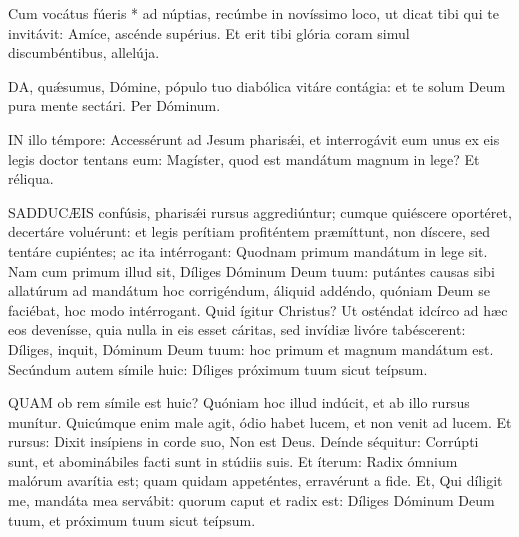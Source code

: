  Cum vocátus fúeris * ad núptias, recúmbe in novíssimo loco, ut dicat tibi qui te invitávit: Amíce, ascénde supérius. Et erit tibi glória coram simul discumbéntibus, allelúja.




\lettrine[lines=2]{D}{A}, quǽsumus, Dómine, pópulo tuo diabólica vitáre contágia: et te solum Deum pura mente sectári. Per Dóminum.




\lettrine[lines=2]{I}{N} illo témpore: Accessérunt ad Jesum pharisǽi, et interrogávit eum unus ex eis legis doctor tentans eum: Magíster, quod est mandátum magnum in lege? Et réliqua.



\lettrine[lines=2]{S}{ADDUCÆIS} confúsis, pharisǽi rursus aggrediúntur; cumque quiéscere oportéret, decertáre voluérunt: et legis perítiam profiténtem præmíttunt, non díscere, sed tentáre cupiéntes; ac ita intérrogant: Quodnam primum mandátum in lege sit. Nam cum primum illud sit, Díliges Dóminum Deum tuum: putántes causas sibi allatúrum ad mandátum hoc corrigéndum, áliquid addéndo, quóniam Deum se faciébat, hoc modo intérrogant. Quid ígitur Christus? Ut osténdat idcírco ad hæc eos devenísse, quia nulla in eis esset cáritas, sed invídiæ livóre tabéscerent: Díliges, inquit, Dóminum Deum tuum: hoc primum et magnum mandátum est. Secúndum autem símile huic: Díliges próximum tuum sicut teípsum.



\lettrine[lines=2]{Q}{UAM} ob rem símile est huic? Quóniam hoc illud indúcit, et ab illo rursus munítur. Quicúmque enim male agit, ódio habet lucem, et non venit ad lucem. Et rursus: Dixit insípiens in corde suo, Non est Deus. Deínde séquitur: Corrúpti sunt, et abominábiles facti sunt in stúdiis suis. Et íterum: Radix ómnium malórum avarítia est; quam quidam appeténtes, erravérunt a fide. Et, Qui díligit me, mandáta mea servábit: quorum caput et radix est: Díliges Dóminum Deum tuum, et próximum tuum sicut teípsum.

